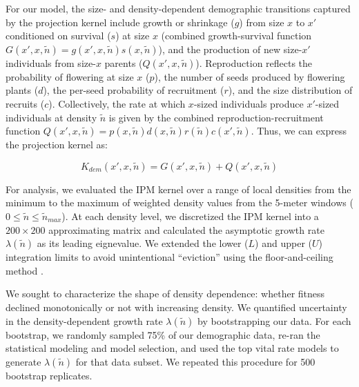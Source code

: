 \documentclass[11pt]{article}\usepackage[]{graphicx}\usepackage[usenames,dvipsnames]{xcolor}
\begin{document}
For our model, the size- and density-dependent demographic transitions captured by the projection kernel include growth or shrinkage ($g$) from size $x$ to $x\prime$ conditioned on survival ($s$) at size $x$ (combined growth-survival function $G(x\prime,x,\tilde{n}) = g(x\prime,x,\tilde{n})s(x,\tilde{n})$), and the production of new size-$x\prime$ individuals from size-$x$ parents ($Q(x\prime,x,\tilde{n})$). Reproduction reflects the probability of flowering at size $x$ ($p$), the number of seeds produced by flowering plants ($d$), the per-seed probability of recruitment ($r$), and the size distribution of recruits ($c$). Collectively, the rate at which $x$-sized individuals produce $x\prime$-sized individuals at density $\tilde{n}$ is given by the combined reproduction-recruitment function $Q(x\prime,x,\tilde{n})=p(x,\tilde{n})d(x,\tilde{n})r(\tilde{n})c(x\prime,\tilde{n})$. Thus, we can express the projection kernel as:
\begin{linenomath*} 
\begin{equation}  \label{eq:K}
K_{dem}(x\prime,x,\tilde{n}) = G(x\prime,x,\tilde{n}) + Q(x\prime,x,\tilde{n})
\end{equation} 
\end{linenomath*}
For analysis, we evaluated the IPM kernel over a range of local densities from the minimum to the maximum of weighted density values from the 5-meter windows ($0 \leq \tilde{n} \leq \tilde{n}_{max}$). 
At each density level, we discretized the IPM kernel into a $200 \times 200$  approximating matrix and calculated the asymptotic growth rate $\lambda(\tilde{n})$ as its leading eignevalue. 
We extended the lower ($L$) and upper ($U$) integration limits to avoid unintentional ``eviction'' using the floor-and-ceiling method \citep{williams2012avoiding}.

We sought to characterize the shape of density dependence: whether fitness declined monotonically or not with increasing density. 
We quantified uncertainty in the density-dependent growth rate $\lambda(\tilde{n})$ by bootstrapping our data. 
For each bootstrap, we randomly sampled 75\% of our demographic data, re-ran the statistical modeling and model selection, and used the top vital rate models to generate $\lambda(\tilde{n})$ for that data subset. 
We repeated this procedure for 500 bootstrap replicates. 
\end{document}
